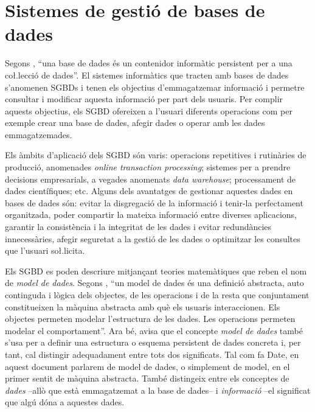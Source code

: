 \section{Sistemes de gestió de bases de dades}
\label{sec:art:sgbd}

Segons \textcite{date:introduction}, ``una base de dades és un
contenidor informàtic persistent per a una co\l.lecció de dades''. El
sistemes informàtics que tracten amb bases de dades s'anomenen
\glspl{SGBD} i tenen els
objectius d'emmagatzemar informació i permetre consultar i modificar
aquesta informació per part dels usuaris.  Per complir aquests
objectius, els \gls{SGBD} ofereixen a l'usuari diferents operacions com per
exemple crear una base de dades, afegir dades o operar amb les dades
emmagatzemades.

Els àmbits d'aplicació dels \gls{SGBD} són varis: operacions repetitives i
rutinàries de producció, anomenades \emph{online transaction
  processing}; sistemes per a prendre decisions empresarials, a
vegades anomenats \emph{data warehouse}; processament de dades
científiques; etc.  Alguns dels avantatges de gestionar aquestes dades
en bases de dades són: evitar la disgregació de la informació i
tenir-la perfectament organitzada, poder compartir la mateixa
informació entre diverses aplicacions, garantir la consistència i la
integritat de les dades i evitar redundàncies innecessàries, afegir
seguretat a la gestió de les dades o optimitzar les consultes que
l'usuari so\l.licita.


Els \gls{SGBD} es poden descriure mitjançant teories matemàtiques que reben
el nom de \emph{model de dades}.  Segons
\citeauthor{date:introduction}, ``un model de dades és una definició
abstracta, auto continguda i lògica dels objectes, de les operacions i
de la resta que conjuntament constitueixen la màquina abstracta amb
què els usuaris interaccionen. Els objectes permeten modelar
l'estructura de les dades. Les operacions permeten modelar el
comportament''. Ara bé, \citeauthor{date:introduction} avisa que el
concepte \emph{model de dades} també s'usa per a definir una
estructura o esquema persistent de dades concreta i, per tant, cal distingir
adequadament entre tots dos significats.  Tal com fa Date, en aquest
document parlarem de model de dades, o simplement de model, en el
primer sentit de màquina abstracta. També distingeix entre els
conceptes de \emph{dades} --allò que està emmagatzemat a la base de
dades-- i \emph{informació} --el significat que algú dóna a aquestes
dades.


